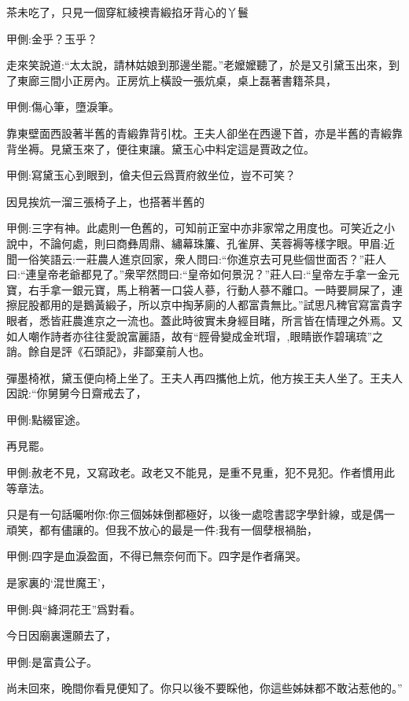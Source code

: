 \begin{parag}
    茶未吃了，只見一個穿紅綾襖青緞掐牙背心的丫鬟\begin{note}甲側:金乎？玉乎？\end{note}走來笑說道:“太太說，請林姑娘到那邊坐罷。”老嬤嬤聽了，於是又引黛玉出來，到了東廊三間小正房內。正房炕上橫設一張炕桌，桌上磊著書籍茶具，\begin{note}甲側:傷心筆，墮淚筆。\end{note}靠東壁面西設著半舊的青緞靠背引枕。王夫人卻坐在西邊下首，亦是半舊的青緞靠背坐褥。見黛玉來了，便往東讓。黛玉心中料定這是賈政之位。\begin{note}甲側:寫黛玉心到眼到，傖夫但云爲賈府敘坐位，豈不可笑？\end{note}因見挨炕一溜三張椅子上，也搭著半舊的\begin{note}甲側:三字有神。此處則一色舊的，可知前正室中亦非家常之用度也。可笑近之小說中，不論何處，則曰商彝周鼎、繡幕珠簾、孔雀屏、芙蓉褥等樣字眼。甲眉:近聞一俗笑語云:一莊農人進京回家，衆人問曰:“你進京去可見些個世面否？”莊人曰:“連皇帝老爺都見了。”衆罕然問曰:“皇帝如何景況？”莊人曰:“皇帝左手拿一金元寶，右手拿一銀元寶，馬上稍著一口袋人蔘，行動人蔘不離口。一時要屙屎了，連擦屁股都用的是鵝黃緞子，所以京中掏茅廁的人都富貴無比。”試思凡稗官寫富貴字眼者，悉皆莊農進京之一流也。蓋此時彼實未身經目睹，所言皆在情理之外焉。又如人嘲作詩者亦往往愛說富麗語，故有“脛骨變成金玳瑁，,眼睛嵌作碧璃琉”之誚。餘自是評《石頭記》，非鄙棄前人也。\end{note}彈墨椅袱，黛玉便向椅上坐了。王夫人再四攜他上炕，他方挨王夫人坐了。王夫人因說:“你舅舅今日齋戒去了，\begin{note}甲側:點綴宦途。\end{note}再見罷。\begin{note}甲側:赦老不見，又寫政老。政老又不能見，是重不見重，犯不見犯。作者慣用此等章法。\end{note}只是有一句話囑咐你:你三個姊妹倒都極好，以後一處唸書認字學針線，或是偶一頑笑，都有儘讓的。但我不放心的最是一件:我有一個孽根禍胎，\begin{note}甲側:四字是血淚盈面，不得已無奈何而下。四字是作者痛哭。\end{note}是家裏的‘混世魔王’，\begin{note}甲側:與“絳洞花王”爲對看。\end{note}今日因廟裏還願去了，\begin{note}甲側:是富貴公子。\end{note}尚未回來，晚間你看見便知了。你只以後不要睬他，你這些姊妹都不敢沾惹他的。”
\end{parag}


